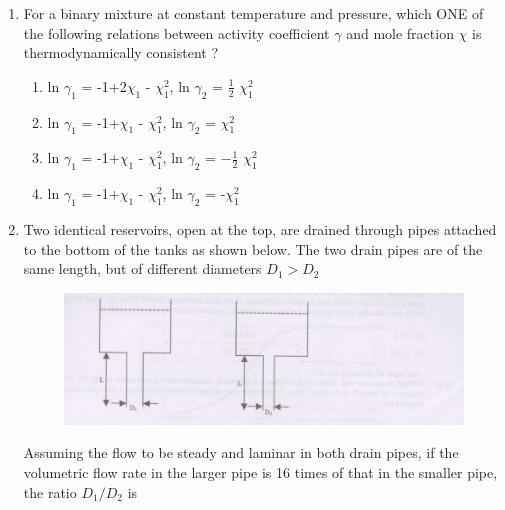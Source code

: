 \documentclass[journal,12pt,onecolumn]{IEEEtran}
\theoremstyle{remark}
\begin{document}
\begin{enumerate}
		\item For a binary mixture at constant temperature and pressure, which ONE of the following relations between activity coefficient $\gamma$ and mole fraction $\chi$ is thermodynamically consistent ? 
		\begin{enumerate}
			\item ln $\gamma_1$ = -1+2$\chi_{1}$ - $\chi_{1}^2$, ln $\gamma_{2}$ = $\frac{1}{2}$ $\chi_{1}^2$
			\item ln $\gamma_{1}$ = -1+$\chi_{1}$ - $\chi_{1}^2$, ln $\gamma_{2}$ = $\chi_{1}^2$
			\item ln $\gamma_{1}$ = -1+$\chi_{1}$ - $\chi_{1}^2$, ln $\gamma_{2}$ = $-\frac{1}{2}$ $\chi_{1}^2$
			\item ln $\gamma_{1}$ = -1+$\chi_{1}$ - $\chi_{1}^2$, ln $\gamma_{2}$ = -$\chi_{1}^2$
		\end{enumerate}
		
		\hfill {}
		
		\item Two identical reservoirs, open at the top, are drained through pipes attached to the bottom of the tanks as shown below. The two drain pipes are of the same length, but of different diameters $D_1>D_2$
		
		\begin{figure}[H]
			\centering
			\includegraphics[width = 0.7\columnwidth]{q30.png}
			\caption{}
			\label{fig:Q30}
		\end{figure}
		
		Assuming the flow to be steady and laminar in both drain pipes, if the volumetric flow rate in the larger pipe is 16 times of that in the smaller pipe, the ratio $D_1/ D_2$ is 
		\begin{enumerate}
		\end{enumerate}
		
		\hfill {}
		

\end{enumerate}
\end{document}
